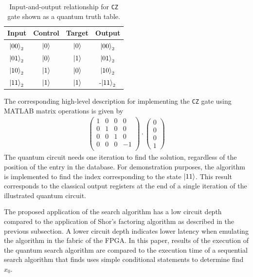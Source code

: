\begin{table}[ht!]
	\centering
	\caption[Table Showing the Input-and-Output Relationship of the \texttt{CZ} Gate in a Two-Qubit System.]{Input-and-output relationship for \texttt{CZ} gate shown as a quantum truth table.}
	\label{tab:grover-phase-flip}
	\begin{tabular}{ |c|c|c|c| } 
		\hline
		\textbf{Input} & \textbf{Control} & \textbf{Target} & \textbf{Output}\\ 
		\hline
		$\ket{00}_2$ & $\ket{0} $& $\ket{0}$ & $\ket{00}_2$  \\ 
		\hline
		$\ket{01}_2$ & $\ket{0}$ & $\ket{1}$ & $\ket{01}_2$ \\ 
		\hline
		$\ket{10}_2$ & $\ket{1}$ & $\ket{0}$ & $\ket{10}_2$ \\ 
		\hline
		$\ket{11}_2$ & $\ket{1}$ & $\ket{1}$ & -$\ket{11}_2$ \\ 
		\hline
	\end{tabular}
\end{table}
The corresponding high-level description for implementing the \texttt{CZ} gate using MATLAB matrix operations is given by
\begin{align}
	\left(\begin{matrix}
		1	 &	0	& 0 & 0\\
		0	 &	1	& 0 & 0\\	
		0	 &	0	& 1 & 0\\
		0	 &	0	& 0 & -1\\	
	\end{matrix}\right)\cdot\left(\begin{matrix}
	0 \\ 0 \\ 0 \\ 1
\end{matrix}\right)
\end{align}
The quantum circuit needs one iteration to find the solution, regardless of the position of the entry in the database. For demonstration purposes, the algorithm is implemented to find the index corresponding to the state $\ket{11}$. This result corresponds to the classical output registers at the end of a single iteration of the illustrated quantum circuit.

The proposed application of the search algorithm has a low circuit depth compared to the application of Shor's factoring algorithm as described in the previous subsection. A lower circuit depth indicates lower latency when emulating the algorithm in the fabric of the FPGA. In this paper, results of the execution of the quantum search algorithm are compared to the execution time of a sequential search algorithm that finds uses simple conditional statements to determine find $x_0$. 
 
